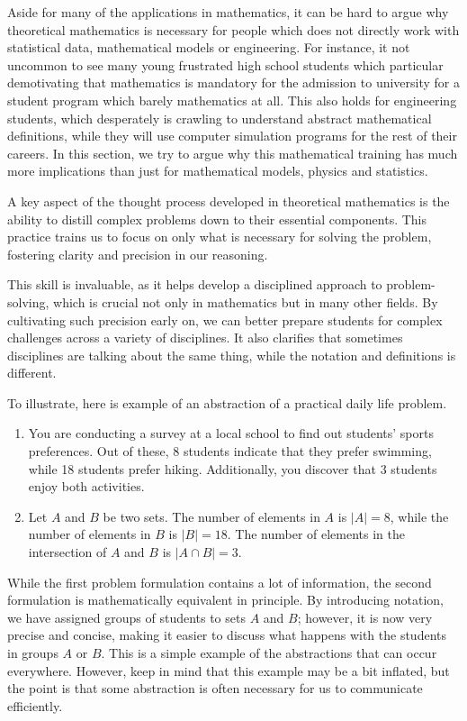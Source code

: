 \documentclass[10pt,twocolumn]{article}
\begin{document}
\begin{sloppy}
Aside for many of the applications in mathematics, it can be hard to argue why theoretical mathematics is necessary for people which does not directly work with statistical data, mathematical models or engineering.
For instance, it not uncommon to see many young
frustrated high school students
which particular demotivating that
mathematics is mandatory for the admission to university for a student program which barely mathematics at all. This also holds for engineering students, which desperately is crawling to understand abstract mathematical definitions, while they will use computer
simulation programs for the rest of their careers. In this section, we try to argue why this mathematical training has much more implications than just for mathematical models, physics and statistics.

A key aspect of the thought process developed in theoretical mathematics is the ability to distill complex problems down to their essential components. This practice trains us to focus on only what is necessary for solving the problem, fostering clarity and precision in our reasoning.

This skill is invaluable, as it helps develop a disciplined approach to problem-solving, which is crucial not only in mathematics but in many other fields. By cultivating such precision early on, we can better prepare students for complex challenges
across a variety of disciplines. It also clarifies that sometimes disciplines are talking about the same thing, while the notation and definitions is different.

To illustrate, here is example of an abstraction of a practical daily life problem.

\begin{enumerate}[label=\arabic*)]
    \item
You are conducting a survey at a local school to find out students' sports preferences. Out of these, 8 students indicate that they prefer swimming, while 18 students prefer hiking.
Additionally, you discover that 3 students enjoy both activities.
    \item Let \( A \) and \( B \) be two sets. The number of elements in \( A \) is \( |A| = 8 \), while the number of elements in \( B \) is \( |B| = 18 \). The number of elements in the intersection of \( A \) and \( B \) is \( |A \cap B| = 3 \).

\end{enumerate}

While the first problem formulation contains a lot of information, the second formulation is mathematically equivalent in principle. By introducing notation, we have assigned groups of students to sets \( A \) and \( B \); however, it is now very
precise and concise, making it easier to discuss what happens with the students in groups \( A \) or \( B \).
This is a simple example of the abstractions that can occur everywhere. However, keep in mind that this example may be a bit inflated, but the point is that some abstraction is often necessary for us to communicate efficiently.



\end{sloppy}
\end{document}

